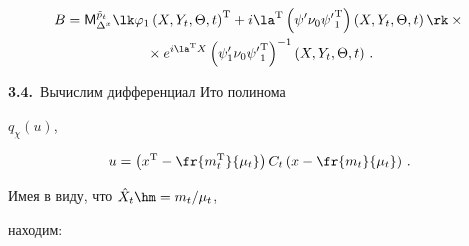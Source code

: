     \begin{multline*}

B=

    {\sf M}_{\Delta^x}^{\tilde{p}_t}  \lk \varphi_1 \left(X,Y_t,\Theta,t\right)^{\mathrm{T}} +

     i\la^{\mathrm{T}} \left(\psi'\nu_0 {\psi'}_1^{\mathrm{T}}\right) 

     \left(X,Y_t,\Theta,t\right)\rk\times{}\\

{}\times e^{i\la^{\mathrm{T}} X} \left(\psi_1' \nu_0 {\psi'}_1^{\mathrm{T}}\right)^{-1} 

\left(X,Y_t,\Theta,t\right)\,.


\end{multline*}



\textbf{3.4.}\ Вычислим дифференциал Ито полинома 

$q_\chi (u)$, 

$$ 

u= \left(x^{\mathrm{T}} -\fr{m_t^{\mathrm{T}}}{\mu_t}\right) 

C_t\left(x-\fr{m_t}{\mu_t}\right)\,.

$$

Имея в виду, что  $\hat X_t \hm= m_t/\mu_t$, 

находим:


